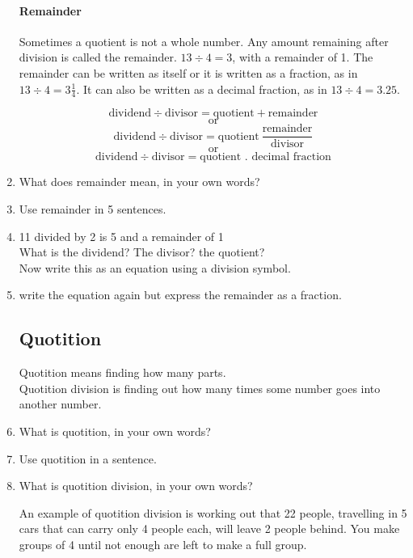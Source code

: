 \documentclass[12pt]{article}
\begin{document}
\begin{enumerate}
\paragraph{Remainder}
Sometimes a quotient is not a whole number. Any amount remaining after division is called the remainder. $13 \div 4 = 3$, with a remainder of 1. The remainder can be written as itself or it is written as a fraction, as in $13 \div 4 = 3 \frac{1}{4}$. It can also be written as a decimal fraction, as in $13 \div 4 = 3.25.$

$$\textrm{dividend} \div \textrm{divisor} = \textrm{quotient} + \textrm{remainder}$$
$$\textrm{or}$$
$$\textrm{dividend} \div \textrm{divisor} = \textrm{quotient} \ \frac{\textrm{remainder}}{\textrm{divisor}}$$
$$\textrm{or}$$
$$\textrm{dividend} \div \textrm{divisor} = \textrm{quotient . decimal fraction}$$

\item What does remainder mean, in your own words?
\item Use remainder in 5 sentences.

\item 11 divided by 2 is 5 and a remainder of 1\\ What is the dividend? The divisor? the quotient?\\ Now write this as an equation using a division symbol.

\item write the equation again but express the remainder as a fraction.

\subsection*{Quotition}

Quotition means finding how many parts.\\

Quotition division is finding out how many times some number goes into another number.\\

\item What is quotition, in your own words?
\item Use quotition in a sentence.
\item What is quotition division, in your own words?

An example of quotition division is working out that 22 people, travelling in 5 cars that can carry only 4 people each, will leave 2 people behind. You make groups of 4 until not enough are left to make a full group.\\


\end{enumerate}
\end{document}
